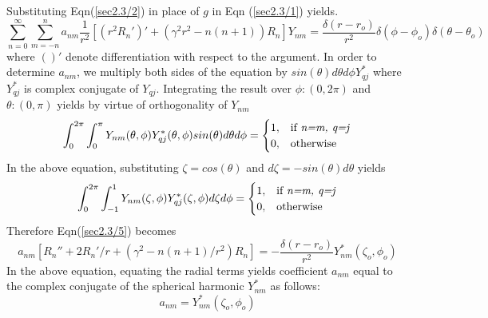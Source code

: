 Substituting Eqn(\ref{sec2.3/2}) in place of $g$ in Eqn (\ref{sec2.3/1}) yields.
\begin{equation}
\label{sec2.3/5}
\sum_{n=0}^{\infty} \sum_{m=-n}^{n} a_{nm}
\frac{1}{r^2} \left [ ( r^2 R_n')' + (\gamma^2 r^2 - n(n+1))R_n \right ] Y_{nm}
= \frac{\delta (r-r_o)}{r^2} \delta (\phi-\phi_o)\delta(\theta-\theta_o) 
\end{equation}
where $()'$ denote differentiation with respect to the argument.
In order to determine  $a_{nm}$, we  multiply both sides of the equation by $ sin(\theta) d\theta d\phi Y_{qj}^*$ where $Y^{*}_{qj}$ is complex conjugate of $Y_{qj}$. Integrating the result 
over $\phi:(0,2\pi)$ and $\theta:(0,\pi)$ yields by virtue of orthogonality
of $Y_{nm}$
\begin{equation}
\label{sec2.3/7}
\int_{0}^{2\pi}\int_{0}^{\pi}Y_{nm}(\theta,\phi)Y_{qj}^{*}(\theta,\phi)sin(\theta)d\theta d\phi = \begin{cases}1,&\text{if \textit{n=m, q=j}}\\
0 ,& \text {otherwise}
\end{cases}
\end{equation}
In the above equation, substituting $\zeta= cos(\theta)$ and $d\zeta= -sin(\theta)d\theta$ yields 
\begin{equation}
\int_{0}^{2\pi}\int_{-1}^{1}Y_{nm}(\zeta,\phi)Y_{qj}^{*}(\zeta,\phi)d\zeta d\phi = \begin{cases}1,&\text{if \textit{n=m, q=j}}\\
0 ,& \text {otherwise}
\end{cases} 
\end{equation}
 Therefore Eqn(\ref{sec2.3/5}) becomes
 \begin{equation}
a_{nm} \left [ R_n'' + 2 R_n'/r + (\gamma^2 - n(n+1)/r^2 )R_n \right ] 
= - \frac{\delta (r-r_o)}{r^2} Y_{nm}^*(\zeta_o,\phi_o )
\end{equation}
In the above equation, equating the radial terms yields coefficient $a_{nm}$ equal to the complex conjugate of the spherical harmonic $Y_{nm}^{*}$ as follows:
\begin{equation}
a_{nm} = Y_{nm}^*(\zeta_o,\phi_o )
\end{equation}

